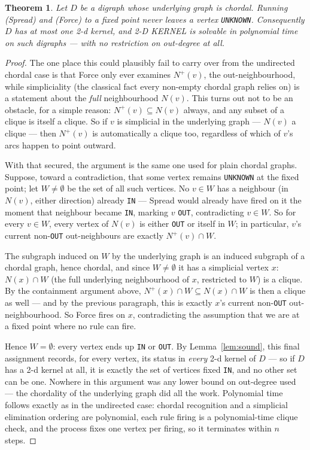 \documentclass[11pt]{article}
\theoremstyle{plain}
\newtheorem{theorem}{Theorem}
\theoremstyle{definition}
\begin{document}
\begin{theorem}
Let $D$ be a digraph whose underlying graph is chordal. Running (Spread) and
(Force) to a fixed point never leaves a vertex \texttt{UNKNOWN}. Consequently $D$
has at most one 2-d kernel, and 2-D KERNEL is solvable in polynomial time on such
digraphs — with \emph{no} restriction on out-degree at all.
\end{theorem}

\begin{proof}
The one place this could plausibly fail to carry over from the undirected chordal
case is that Force only ever examines $N^+(v)$, the out-neighbourhood, while
simpliciality (the classical fact every non-empty chordal graph relies on) is a
statement about the \emph{full} neighbourhood $N(v)$. This turns out not to be an
obstacle, for a simple reason: $N^+(v) \subseteq N(v)$ always, and any subset of a
clique is itself a clique. So if $v$ is simplicial in the underlying graph — $N(v)$
a clique — then $N^+(v)$ is automatically a clique too, regardless of which of $v$'s
arcs happen to point outward.

With that secured, the argument is the same one used for plain chordal graphs.
Suppose, toward a contradiction, that some vertex remains \texttt{UNKNOWN} at the
fixed point; let $W \ne \emptyset$ be the set of all such vertices. No $v \in W$ has
a neighbour (in $N(v)$, either direction) already \texttt{IN} — Spread would already
have fired on it the moment that neighbour became \texttt{IN}, marking $v$
\texttt{OUT}, contradicting $v \in W$. So for every $v \in W$, every vertex of
$N(v)$ is either \texttt{OUT} or itself in $W$; in particular, $v$'s current
non-\texttt{OUT} out-neighbours are exactly $N^+(v) \cap W$.

The subgraph induced on $W$ by the underlying graph is an induced subgraph of a
chordal graph, hence chordal, and since $W \ne \emptyset$ it has a simplicial vertex
$x$: $N(x) \cap W$ (the full underlying neighbourhood of $x$, restricted to $W$) is
a clique. By the containment argument above, $N^+(x) \cap W \subseteq N(x) \cap W$
is then a clique as well — and by the previous paragraph, this is exactly $x$'s
current non-\texttt{OUT} out-neighbourhood. So Force fires on $x$, contradicting the
assumption that we are at a fixed point where no rule can fire.

Hence $W = \emptyset$: every vertex ends up \texttt{IN} or \texttt{OUT}. By
Lemma~\ref{lem:sound}, this final assignment records, for every vertex, its status
in \emph{every} 2-d kernel of $D$ — so if $D$ has a 2-d kernel at all, it is exactly the
set of vertices fixed \texttt{IN}, and no other set can be one. Nowhere in this
argument was any lower bound on out-degree used — the chordality of the underlying
graph did all the work. Polynomial time follows exactly as in the undirected case:
chordal recognition and a simplicial elimination ordering are polynomial, each rule
firing is a polynomial-time clique check, and the process fixes one vertex per
firing, so it terminates within $n$ steps.
\end{proof}
\end{document}

